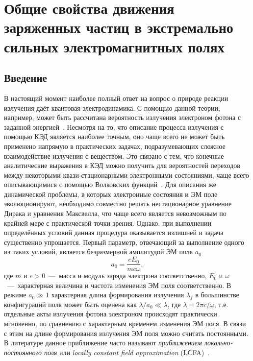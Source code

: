 \chapter{Общие свойства движения заряженных частиц в экстремально сильных электромагнитных полях}\label{ch:ch1}

\section{Введение}
\label{sec:ch1/sec1}

В настоящий момент наиболее полный ответ на вопрос о природе реакции излучения даёт квантовая электродинамика.
С помощью данной теории, например, может быть рассчитана вероятность излучения электроном фотона с заданной энергией~\cite{berestetskii1982quantum, Baier98}.
Несмотря на то, что описание процесса излучения с помощью КЭД является наиболее точным, оно чаще всего не может быть применено напрямую в практических задачах, подразумевающих сложное взаимодействие излучения с веществом.
Это связано с тем, что конечные аналитические выражения в КЭД можно получить для вероятностей переходов между некоторыми квази-стационарными электронными состояниями, чаще всего описывающимися с помощью Волковских функций~\cite{wolkow1935klasse}.
Для описания же динамической проблемы, в которых электронные состояния и ЭМ поле эволюционируют, необходимо совместно решать нестационарное уравнение Дирака и уравнения Максвелла, что чаще всего является невозможным по крайней мере с практической точки зрения. 
Однако, при выполнении определённых условий данная процедура оказывается излишней и задача существенно упрощается.
Первый параметр, отвечающий за выполнение одного из таких условий, является безразмерной амплитудой ЭМ поля $a_0$
\begin{equation}
    a_0  = \frac{eE_0}{m c \omega},
\end{equation}
где $m$ и $e>0$~---~масса и модуль заряда электрона соответственно, $E_0$ и $\omega$~---~характерная величина и частота изменения ЭМ поля соответственно.
В режиме $a_0 \gg 1$ характерная длина формирования излучения $\lambda_f$ в большинстве конфигураций поля может быть оценена как $\lambda / a_0 \ll \lambda$, где $\lambda = 2\pi c/\omega$, т.е. отдельные акты излучения фотона электроном происходят практически мгновенно, по сравнению с характерным временем изменения ЭМ поля.
В связи с этим на длине формирования излучения ЭМ поля можно считать постоянными.
В литературе данное приближение часто называют \textit{приближением локально-постоянного поля} или \textit{locally constant field approximation} (LCFA)~\cite{nikishov1964quantum, berestetskii1982quantum, ritus1985quantum}.
